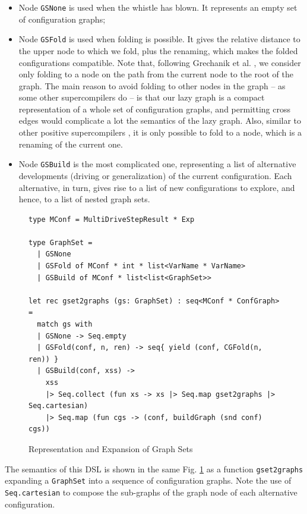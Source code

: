 \documentclass[submission,copyright,creativecommons]{eptcs}
\begin{document}
\begin{itemize}
  \item Node \verb|GSNone| is used when the whistle has blown. 
    It represents an empty set of configuration graphs;
  \item Node \verb|GSFold| is used when folding is possible. 
    It gives the relative distance to the upper node to which we fold, 
    plus the renaming, which makes the folded configurations compatible.
    Note that, following Grechanik et al. \cite{Romanenko2014StagedMRSC}, we consider
    only folding to a node on the path from the current node to the root of the graph.
    The main reason to avoid folding to other nodes in the graph -- as some other
    supercompilers do -- is that our lazy graph is a compact representation of
    a whole set of configuration graphs, and permitting cross edges 
    would complicate a lot the semantics of the lazy graph.
    Also, similar to other positive supercompilers \cite{Sorensen1994TurchinSupercompiler,sorm98b,TMR/SCP2014},
    it is only possible to fold to a node, which is a renaming of the current one.
  \item Node \verb|GSBuild| is the most complicated one, representing a list
    of alternative developments (driving or generalization) of the current configuration.
    Each alternative, in turn, gives rise to a list of new configurations to explore,
    and hence, to a list of nested graph sets.
\end{itemize}

\begin{figure}
\begin{lstlisting}
type MConf = MultiDriveStepResult * Exp

type GraphSet =
  | GSNone
  | GSFold of MConf * int * list<VarName * VarName>
  | GSBuild of MConf * list<list<GraphSet>>

let rec gset2graphs (gs: GraphSet) : seq<MConf * ConfGraph> =
  match gs with
  | GSNone -> Seq.empty
  | GSFold(conf, n, ren) -> seq{ yield (conf, CGFold(n, ren)) }
  | GSBuild(conf, xss) ->
    xss
    |> Seq.collect (fun xs -> xs |> Seq.map gset2graphs |> Seq.cartesian)
    |> Seq.map (fun cgs -> (conf, buildGraph (snd conf) cgs))
\end{lstlisting}
\caption{Representation and Expansion of Graph Sets}
\label{fig:GraphSet}
\end{figure}

The semantics of this DSL is shown in the same Fig. \ref{fig:GraphSet} as
a function \verb|gset2graphs| expanding a \verb|GraphSet| into a sequence 
of configuration graphs.
Note the use of \verb|Seq.cartesian| to compose the sub-graphs of 
the graph node of each alternative configuration.
\end{document}
